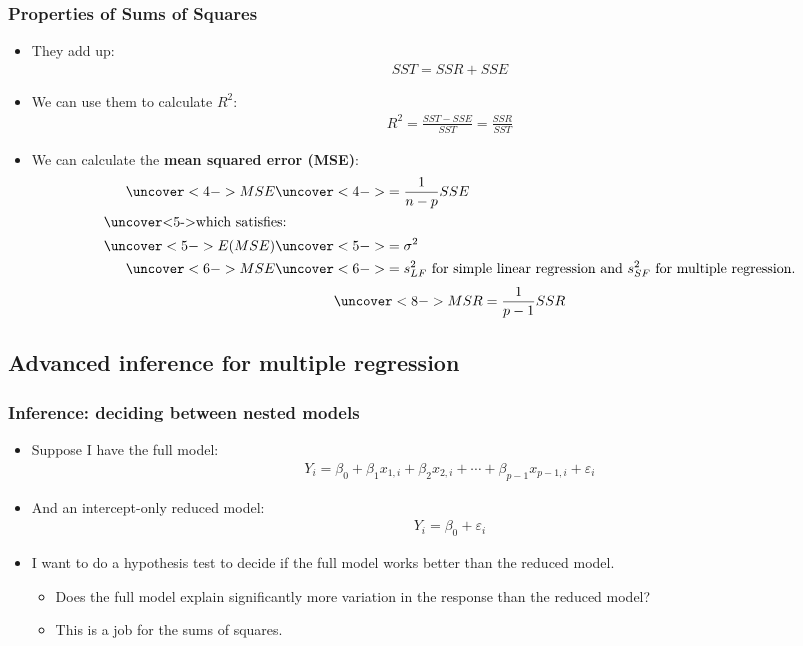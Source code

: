 \documentclass[handout]{beamer}\usepackage[]{graphicx}\usepackage[]{color}
\providecommand{\e}{\varepsilon}
\numberwithin{equation}{section}
\begin{document}
\begin{frame}
\frametitle{Properties of Sums of Squares} \scriptsize
\begin{itemize}
\item They add up:
\begin{align*}
SST = SSR + SSE
\end{align*}
\pause \item We can use them to calculate $R^2$:
\begin{align*}
R^2 = \frac{SST - SSE}{SST} = \frac{SSR}{SST}
\end{align*}
\pause \item We can calculate the {\bf mean squared error (MSE)}:
\begin{align*}
\uncover<4->{MSE} &\uncover<4->{= \frac{1}{n-p} SSE} \\
\intertext{\uncover<5->{which satisfies:}}
\uncover<5->{E(MSE)} &\uncover<5->{= \sigma^2} \\
\uncover<6->{MSE} &\uncover<6->{= s_{LF}^2 \text{ for simple linear regression and } s_{SF}^2 \text{ for multiple regression.}}
\end{align*}
\begin{align*}
\uncover<8->{MSR = \frac{1}{p-1} SSR}
\end{align*}
\end{itemize}
\end{frame}




\subsection{Advanced inference for multiple regression}

\begin{frame}
\frametitle{Inference: deciding between nested models}
\begin{itemize}
\item Suppose I have the full model:
\begin{align*}
Y_i = \beta_0 + \beta_1 x_{1, i}  + \beta_2 x_{2, i} + \cdots + \beta_{p-1} x_{p-1, i} + \e_i
\end{align*}
\pause \item And an intercept-only reduced model:
\begin{align*}
Y_i = \beta_0 + \e_i
\end{align*}
\pause \item I want to do a hypothesis test to decide if the full model works better than the reduced model.
\begin{itemize}
\pause \item Does the full model explain significantly more variation in the response than the reduced model?
\pause \item This is a job for the sums of squares.
\end{itemize}
\end{itemize}
\end{frame}
\end{document}
